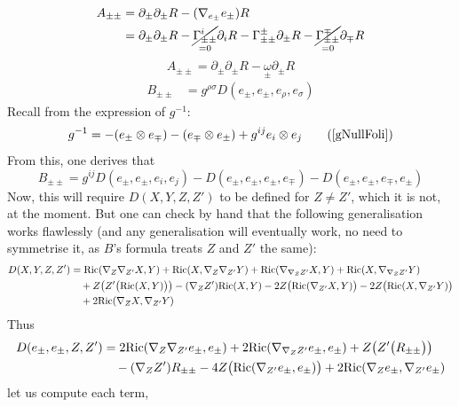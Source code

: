 \documentclass[a4paper,11pt]{article}
\numberwithin{equation}{section}
\theoremstyle{definition}
\newcommand{\R}{{\mathrm{Ric}}}
\begin{document}
\begin{align*}
    A_{\pm\pm} &= \partial_\pm \partial_\pm R - (\nabla_{e_\pm}e_\pm) R\\
    &= \partial_\pm \partial_\pm R - \underset{=0}{\cancel{\Gamma_{\pm\pm}^i}} \partial_i R - \Gamma_{\pm\pm}^\pm \partial_\pm R - \underset{=0}{\cancel{\Gamma_{\pm\pm}^\mp}} \partial_\mp R
\end{align*}
\begin{equation}
    \boxed{A_{\pm\pm} = \partial_\pm \partial_\pm R - \underset{\pm}{\omega}\partial_\pm R}
\end{equation}
\begin{align*}
    B_{\pm\pm}&= g^{\rho\sigma} D(e_\pm,e_\pm, e_\rho, e_\sigma)
\end{align*}
Recall from \cite{Art} the expression of $g^{-1}$:
\begin{equation}
g^{-1} = -(e_\pm \otimes e_\mp) - (e_\mp \otimes e_\pm) + g^{ij}e_i\otimes e_j \tag{\ref{gNullFoli}}
\end{equation}
From this, one derives that 
$$B_{\pm\pm}=g^{ij}D(e_\pm,e_\pm, e_i, e_j) - D(e_\pm,e_\pm, e_\pm, e_\mp) - D(e_\pm,e_\pm, e_\mp, e_\pm) $$
Now, this will require $D(X,Y,Z,Z')$ to be defined for $Z\ne Z'$, which it is not, at the moment. But one can check by hand that the following generalisation works flawlessly (and any generalisation will eventually work, no need to symmetrise it, as $B$'s formula treats $Z$ and $Z'$ the same):
\begin{align}
    D(X,Y,Z,Z') 
    &=\R(\nabla_Z\nabla_{Z'} X ,Y )
    + \R( X ,\nabla_Z\nabla_{Z'} Y )
    + \R(\nabla_{\nabla_ZZ'} X , Y )
    + \R( X ,\nabla_{\nabla_ZZ'}Y )\notag\\
    & \quad + Z\big(Z'\big(\R(X ,Y )\big)\big)-(\nabla_Z Z')\R(X ,Y )
    -2 Z\big(\R(\nabla_{Z'} X , Y )\big)
    -2 Z\big(\R(X , \nabla_{Z'} Y )\big) \notag\\
    & \quad + 2 \R(\nabla_Z X , \nabla_{Z'} Y ) 
\end{align} Thus \begin{align}
    D(e_\pm,e_\pm,Z,Z') 
    &= 2 \R(\nabla_Z\nabla_{Z'} e_\pm ,e_\pm )
    + 2 \R(\nabla_{\nabla_ZZ'} e_\pm ,e_\pm )
    + Z\big(Z'\big(R_{\pm\pm}\big)\big)\\
    & \quad
    -(\nabla_Z Z') R_{\pm\pm}
    -4 Z\big(\R(\nabla_{Z'} e_\pm , e_\pm )\big)
    + 2 \R(\nabla_Z e_\pm , \nabla_{Z'} e_\pm )\notag
\end{align}
let us compute each term,
\end{document}
